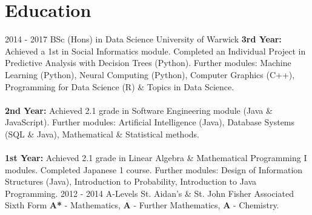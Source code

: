 \documentclass[]{friggeri-cv}
\begin{document}
\section{Education}
\begin{entrylist}
  \entry %
    {2014 - 2017}
    {BSc (Hons) in Data Science}
    {University of Warwick}
    {\textbf{3rd Year:} Achieved a 1st in Social Informatics module. Completed an Individual Project in Predictive Analysis with Decision Trees (Python). Further modules: Machine Learning (Python), Neural Computing (Python), Computer Graphics (C++), Programming for Data Science (R) \& Topics in Data Science.\\\\
    \textbf{2nd Year:} Achieved 2.1 grade in Software Engineering module (Java \& JavaScript). Further modules: Artificial Intelligence (Java), Database Systems (SQL \& Java), Mathematical \& Statistical methods.\\\\
    \textbf{1st Year:} Achieved 2.1 grade in Linear Algebra \& Mathematical Programming I modules. Completed Japanese 1 course. Further modules: Design of Information Structures (Java), Introduction to Probability, Introduction to Java Programming.}
  \entry %
    {2012 - 2014}
    {A-Levels}
    {St. Aidan's \& St. John Fisher Associated Sixth Form}
    {\textbf{A*} - Mathematics, \textbf{A} - Further Mathematics, \textbf{A} - Chemistry.}
\end{entrylist}
\end{document}
